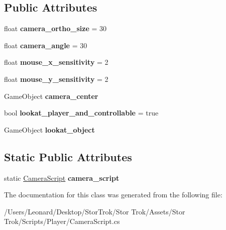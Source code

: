 \subsection*{Public Attributes}
\begin{DoxyCompactItemize}
\item 
\mbox{\label{class_camera_script_a6e44b5bc41c6ae01f37bbaebcf5970c2}} 
float {\bfseries camera\+\_\+ortho\+\_\+size} = 30
\item 
\mbox{\label{class_camera_script_ab045581c45e499bdbf45a4b851ccc348}} 
float {\bfseries camera\+\_\+angle} = 30
\item 
\mbox{\label{class_camera_script_a1217a340c62b4bae90b9e6ce025639bb}} 
float {\bfseries mouse\+\_\+x\+\_\+sensitivity} = 2
\item 
\mbox{\label{class_camera_script_a05b4e9ac080a524baf6acd9069c1690c}} 
float {\bfseries mouse\+\_\+y\+\_\+sensitivity} = 2
\item 
\mbox{\label{class_camera_script_a0d20cdfac93124cc8779f2c618d87118}} 
Game\+Object {\bfseries camera\+\_\+center}
\item 
\mbox{\label{class_camera_script_a91f4127c39260706fdc3db3ad60c0eeb}} 
bool {\bfseries lookat\+\_\+player\+\_\+and\+\_\+controllable} = true
\item 
\mbox{\label{class_camera_script_a12cea733980757a4cd48d91717daf607}} 
Game\+Object {\bfseries lookat\+\_\+object}
\end{DoxyCompactItemize}
\subsection*{Static Public Attributes}
\begin{DoxyCompactItemize}
\item 
\mbox{\label{class_camera_script_adfea0fdca00f979407b479a33230a259}} 
static \hyperlink{class_camera_script}{Camera\+Script} {\bfseries camera\+\_\+script}
\end{DoxyCompactItemize}


The documentation for this class was generated from the following file\+:\begin{DoxyCompactItemize}
\item 
/\+Users/\+Leonard/\+Desktop/\+Stor\+Trok/\+Stor Trok/\+Assets/\+Stor Trok/\+Scripts/\+Player/Camera\+Script.\+cs\end{DoxyCompactItemize}
